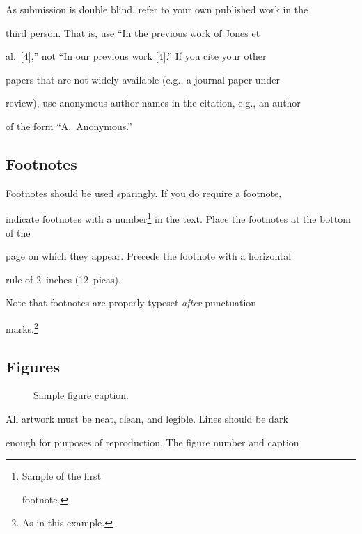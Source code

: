 \documentclass{article}
\begin{document}
As submission is double blind, refer to your own published work in the

third person. That is, use ``In the previous work of Jones et

al.\ [4],'' not ``In our previous work [4].'' If you cite your other

papers that are not widely available (e.g., a journal paper under

review), use anonymous author names in the citation, e.g., an author

of the form ``A.\ Anonymous.''



\subsection{Footnotes}



Footnotes should be used sparingly.  If you do require a footnote,

indicate footnotes with a number\footnote{Sample of the first

  footnote.} in the text. Place the footnotes at the bottom of the

page on which they appear.  Precede the footnote with a horizontal

rule of 2~inches (12~picas).



Note that footnotes are properly typeset \emph{after} punctuation

marks.\footnote{As in this example.}



\subsection{Figures}



\begin{figure}

  \centering

  \fbox{\rule[-.5cm]{0cm}{4cm} \rule[-.5cm]{4cm}{0cm}}

  \caption{Sample figure caption.}

\end{figure}



All artwork must be neat, clean, and legible. Lines should be dark

enough for purposes of reproduction. The figure number and caption
\end{document}
